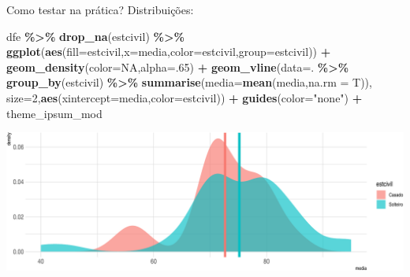 \documentclass[
  9pt,
  ignorenonframetext,
  aspectratio=169]{beamer}
\newenvironment{Shaded}{\begin{snugshade}}{\end{snugshade}}
\newcommand{\DataTypeTok}[1]{\textcolor[rgb]{0.13,0.29,0.53}{#1}}
\newcommand{\DecValTok}[1]{\textcolor[rgb]{0.00,0.00,0.81}{#1}}
\newcommand{\KeywordTok}[1]{\textcolor[rgb]{0.13,0.29,0.53}{\textbf{#1}}}
\newcommand{\NormalTok}[1]{#1}
\newcommand{\OperatorTok}[1]{\textcolor[rgb]{0.81,0.36,0.00}{\textbf{#1}}}
\newcommand{\OtherTok}[1]{\textcolor[rgb]{0.56,0.35,0.01}{#1}}
\newcommand{\StringTok}[1]{\textcolor[rgb]{0.31,0.60,0.02}{#1}}
\begin{document}
\begin{frame}[fragile]{Como testar na prática? Distribuições:}
\protect\hypertarget{como-testar-na-pruxe1tica-distribuiuxe7uxf5es}{}
\begin{Shaded}
\begin{Highlighting}[]
\NormalTok{dfe }\OperatorTok{\%\textgreater{}\%}\StringTok{ }\KeywordTok{drop\_na}\NormalTok{(estcivil) }\OperatorTok{\%\textgreater{}\%}\StringTok{ }
\StringTok{  }\KeywordTok{ggplot}\NormalTok{(}\KeywordTok{aes}\NormalTok{(}\DataTypeTok{fill=}\NormalTok{estcivil,}\DataTypeTok{x=}\NormalTok{media,}\DataTypeTok{color=}\NormalTok{estcivil,}\DataTypeTok{group=}\NormalTok{estcivil)) }\OperatorTok{+}
\StringTok{  }\KeywordTok{geom\_density}\NormalTok{(}\DataTypeTok{color=}\OtherTok{NA}\NormalTok{,}\DataTypeTok{alpha=}\NormalTok{.}\DecValTok{65}\NormalTok{) }\OperatorTok{+}\StringTok{  }
\StringTok{  }\KeywordTok{geom\_vline}\NormalTok{(}\DataTypeTok{data=}\NormalTok{. }\OperatorTok{\%\textgreater{}\%}\StringTok{ }\KeywordTok{group\_by}\NormalTok{(estcivil) }\OperatorTok{\%\textgreater{}\%}\StringTok{ }\KeywordTok{summarise}\NormalTok{(}\DataTypeTok{media=}\KeywordTok{mean}\NormalTok{(media,}\DataTypeTok{na.rm =}\NormalTok{ T)),}
             \DataTypeTok{size=}\DecValTok{2}\NormalTok{,}\KeywordTok{aes}\NormalTok{(}\DataTypeTok{xintercept=}\NormalTok{media,}\DataTypeTok{color=}\NormalTok{estcivil)) }\OperatorTok{+}\StringTok{ }
\StringTok{  }\KeywordTok{guides}\NormalTok{(}\DataTypeTok{color=}\StringTok{"none"}\NormalTok{) }\OperatorTok{+}\StringTok{ }\NormalTok{theme\_ipsum\_mod}
\end{Highlighting}
\end{Shaded}

\includegraphics{aula_11_files/figure-beamer/unnamed-chunk-2-1.pdf}
\end{frame}
\end{document}
